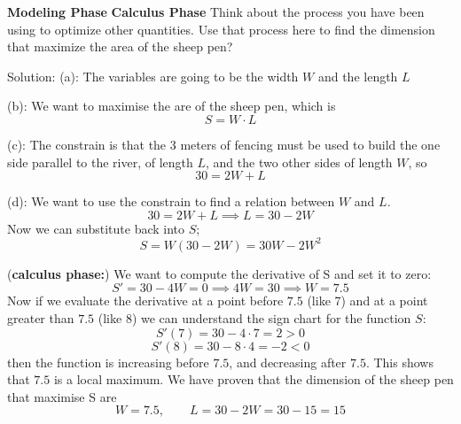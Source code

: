 \documentclass[10pt]{article}
\begin{document}
\begin{enumerate}
\newpage 

{\bf Modeling Phase}
{\bf Calculus Phase} Think about the process you have been using to optimize other quantities. Use that process here to find the dimension that maximize the area of the sheep pen?

 Solution: (a): The variables are going to be the width $W$ and the length $L$


 (b): We want to maximise the are of the sheep pen, which is
 \[
 S=W \cdot L
 \]

 (c): The constrain is that the 3 meters of fencing must be used to build the one side parallel to the river, of length $L$, and the two other sides of length $W$, so
 \[
 30=2W+L
 \]


 (d): We want to use the constrain to find a relation between $W$ and $L$. 
 \[
 30=2W+L \implies L=30-2W
 \]
 Now we can substitute back into $S$; 
 \[
 S=W(30-2W)=30W-2 W^2
 \]


({\bf calculus phase:}) We want to compute the derivative of S and set it to zero:
\[
S'=30-4W=0 \implies 4W=30 \implies W=7.5
\]
Now if we evaluate the derivative at a point before $7.5$ (like 7) and at a point greater than $7.5$ (like 8) we can understand the sign chart for the function $S$:
\[
S'(7)=30-4\cdot 7=2>0
\]
\[
S'(8)=30-8 \cdot 4=-2 <0
\]
then the function is increasing before $7.5$, and decreasing after $7.5$. This shows that $7.5$ is a local maximum. We have proven that the dimension of the sheep pen that maximise S are
\[
W=7.5, \qquad L=30-2W=30-15=15
\]








\end{enumerate}
\end{document}

